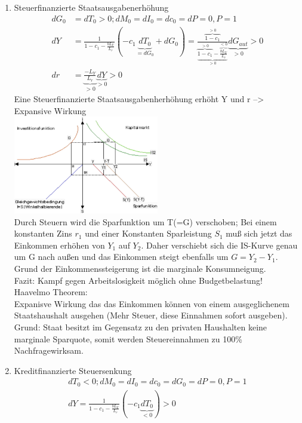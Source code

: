 \documentclass{scrartcl}
\begin{document}
\begin{enumerate}
  \item Steuerfinanzierte Staatsausgabenerh\"{o}hung
  \begin{align*}
    dG_{0}&=dT_{0}>0; dM_{0}=dI_{0}=dc_{0}=dP=0, P=1\\
  dY &= \frac{1}{1-c_1 -\frac{b L_Y}{L_r}} \left(- c_1 \underbrace{dT_{0}}_{=dG_{0}} +dG_{0} \right) = \frac{\overbrace{1-c_1}^{>0}}{\underbrace{\overbrace{1-c_1}^{>0} - \overbrace{\frac{b L_Y}{L_r}}^{<0}}_{>0}} \underbrace{dG_{aut}}_{>0} >0\\
  dr &= \underbrace{\frac{-L_Y}{L_r}}_{>0} \underbrace{dY}_{>0} >0
  \end{align*}
  Eine Steuerfinanzierte Staatsausgabenherh\"{o}hung erh\"{o}ht Y und r --> Expansive Wirkung\\
\includegraphics[width=0.5\textwidth]{Bilder/ISLMSteuerfinanziert.pdf}\\
Durch Steuern wird die Sparfunktion um T(=G) verschoben; Bei einem konstanten Zins $r_1$ und einer Konstanten Sparleistung $S_1$ mu{\ss} sich jetzt das Einkommen erh\"{o}hen von $Y_1$ auf $Y_2$. Daher verschiebt sich die IS-Kurve genau um G nach au{\ss}en und das Einkommen steigt ebenfalls um $G=Y_2-Y_1$. Grund der Einkommenssteigerung ist die marginale Konsumneigung.\\
Fazit: Kampf gegen Arbeitslosigkeit m\"{o}glich ohne Budgetbelastung!\\
Haavelmo Theorem:\\
Expanisve Wirkung das das Einkommen k\"{o}nnen von einem ausgeglichenem Staatshaushalt ausgehen (Mehr Steuer, diese Einnahmen sofort ausgeben). Grund: Staat besitzt im Gegensatz zu den privaten Haushalten keine marginale Sparquote, somit werden Steuereinnahmen zu 100\% Nachfragewirksam.
  \item Kreditfinanzierte Steuersenkung
  \begin{align*}
    dT_{0}<0; dM_{0}=dI_{0}=dc_{0}=dG_{0}=dP=0, P=1\\
  dY = \frac{1}{1-c_1 -\frac{b L_Y}{L_r}} \left(- c_1 \underbrace{dT_{0}}_{<0}\right) >0\\

\end{align*}
\end{enumerate}
\end{document}
